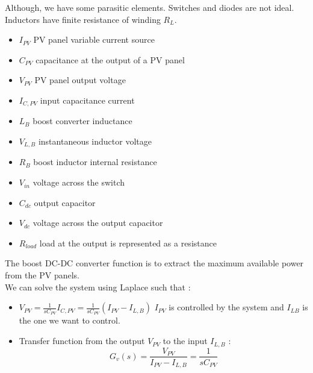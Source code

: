 \documentclass[../main.tex]{subfiles}
\begin{document}
Although, we have some parasitic elements. Switches and diodes are not ideal. Inductors have finite resistance of winding $R_L$. \\
\begin{itemize}
    \item $I_{PV}$ PV panel variable current source\\
    \item $C_{PV}$ capacitance at the output of a PV panel\\
    \item $V_{PV}$ PV panel output voltage\\
    \item $I_{C, PV}$ input capacitance current\\
    \item $L_B$ boost converter inductance\\
    \item $V_{L,B}$ instantaneous inductor voltage\\
    \item $R_B$ boost inductor internal resistance\\
    \item $V_{in}$ voltage across the switch\\
    \item $C_{dc}$ output capacitor\\
    \item $V_{dc}$ voltage across the output capacitor\\
    \item $R_{load}$ load at the output is represented as a resistance\\
\end{itemize}
The boost DC-DC converter function is to extract the maximum available power from the PV panels.\\

We can solve the system using Laplace such that : \begin{itemize}
    \item $V_{PV} = \frac{1}{s C_{PV}} I_{C, PV} = \frac{1}{s C_{PV}}(I_{PV} - I_{L,B})$ \warning $I_{PV}$ is controlled by the system and $I_{LB}$ is the one we want to control.\\
    \item Transfer function from the output $V_{PV}$ to the input $I_{L,B}$ : \begin{equation}G_v(s) = \frac{V_{PV}}{I_{PV} - I_{L,B}} = \frac{1}{sC_{PV}}\end{equation}
\end{itemize}
\end{document}
